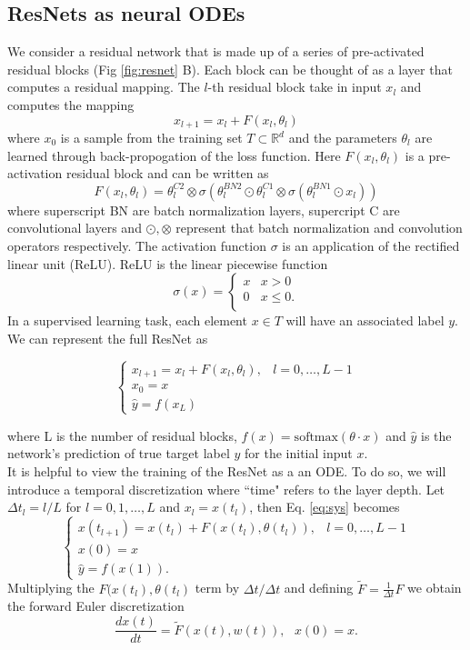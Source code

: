 \documentclass[12pt]{article}
\begin{document}
\subsection{ResNets as neural ODEs}
We consider a residual network that is made up of a series of pre-activated residual blocks (Fig \ref{fig:resnet} B). Each block can be thought of as a layer that computes a residual mapping. The $l$-th residual block take in input $x_l$ and computes the mapping
$$ x_{l+1} = x_{l} + F(x_l,\theta_l)$$
where $x_0$ is a sample from the training set $T \subset \mathbb{R}^d $ and the parameters $\theta_l$ are learned through back-propogation of the loss function. Here $F(x_l,\theta_l)$ is a pre-activation residual block and can be written as
$$ F(x_l,\theta_l) =  \theta_l^{C2}\otimes\sigma(\theta_l^{BN2}\odot\theta_l^{C1}\otimes\sigma(\theta_l^{BN1}\odot x_l))$$
where superscript BN are batch normalization layers, supercript C are convolutional layers and $\odot, \otimes$ represent that batch normalization and convolution operators respectively. The activation function $\sigma$ is an application of the rectified linear unit (ReLU). ReLU is the linear piecewise function
\begin{equation*}
\sigma(x) = \begin{cases} x & x > 0 \\
 0 & x \leq 0. \\
\end{cases}
\end{equation*}
In a supervised learning task, each element $x \in T$ will have an associated label $y$. We can represent the full ResNet as

\begin{equation} \begin{cases}
x_{l+1} = x_l + F(x_l,\theta_l), & l=0,\dots,L-1 \\
x_0 = x \\
\hat y = f(x_L)
\end{cases}
\label{eq:sys}
\end{equation}

where L is the number of residual blocks, $f(x) = \text{softmax}(\theta \cdot x)$ and $\hat y$ is the network's prediction of true target label $y$ for the initial input $x$. \\
\indent It is helpful to view the training of the ResNet as a an ODE. To do so, we will introduce a temporal discretization where ``time" refers to the layer depth. Let $\Delta t_l = l/L$ for $l=0,1,\dots,L$ and $x_l = x(t_l)$, then Eq. \ref{eq:sys} becomes
\begin{equation} \begin{cases}
x(t_{l+1}) = x(t_l) + F(x(t_l),\theta(t_l)), & l=0,\dots,L-1 \\
x(0) = x \\
\hat y = f(x(1)).
\end{cases} \end{equation}
Multiplying the $F(x(t_l),\theta(t_l)$ term by $\Delta t/\Delta t$ and defining $\tilde{F} = \frac{1}{\Delta t} F$ we obtain the forward Euler discretization
\begin{equation}
  \dfrac{dx(t)}{dt} = \tilde{F}(x(t),w(t)),\text{   }  x(0) = x.
\end{equation}
\end{document}
